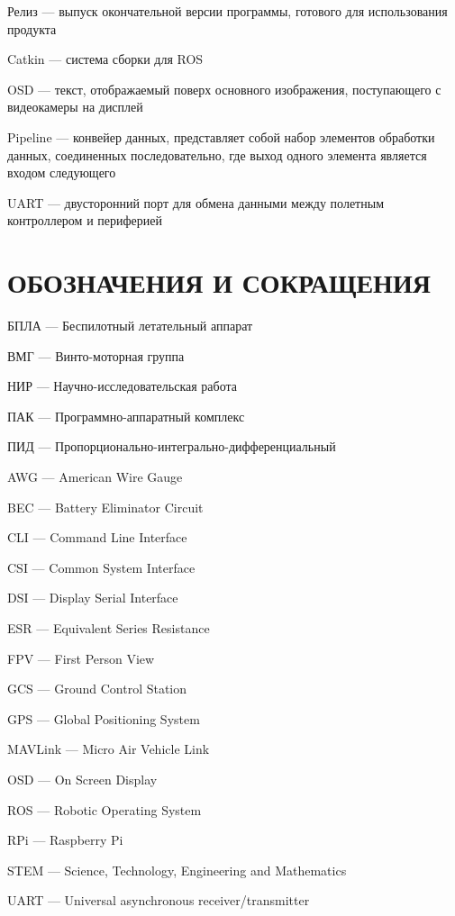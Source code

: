 \documentclass[a4paper,12pt]{article}
\begin{document}
Релиз --- выпуск окончательной версии программы, готового для использования продукта

Catkin --- система сборки для ROS

OSD --- текст, отображаемый поверх основного изображения, поступающего с видеокамеры на дисплей

Pipeline --- конвейер данных, представляет собой набор элементов обработки данных, соединенных последовательно, где выход одного элемента является входом следующего

UART --- двусторонний порт для обмена данными между полетным контроллером и периферией

\pagebreak
\thispagestyle{empty}

\section*{\centering ОБОЗНАЧЕНИЯ И СОКРАЩЕНИЯ}

БПЛА --- Беспилотный летательный аппарат

ВМГ --- Винто-моторная группа

НИР --- Научно-исследовательская работа

ПАК --- Программно-аппаратный комплекс

ПИД --- Пропорционально-интегрально-дифференциальный

AWG --- American Wire Gauge

BEC --- Battery Eliminator Circuit

CLI --- Command Line Interface

CSI --- Common System Interface

DSI --- Display Serial Interface

ESR --- Equivalent Series Resistance

FPV --- First Person View

GCS --- Ground Control Station

GPS --- Global Positioning System

MAVLink --- Micro Air Vehicle Link

OSD --- On Screen Display

ROS --- Robotic Operating System

RPi --- Raspberry Pi

STEM --- Science, Technology, Engineering and Mathematics

UART --- Universal asynchronous receiver/transmitter


\pagebreak
{}
\tableofcontents
\end{document}

